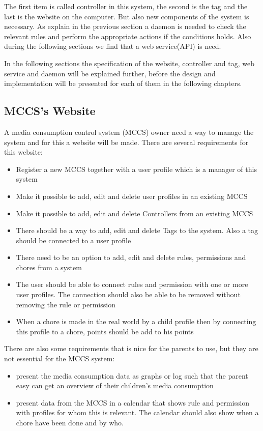 The first item is called controller in this system, the second is the tag and the last is the website on the computer. But also new components of the system is necessary. As explain in the previous section a daemon is needed to check the relevant rules and perform the appropriate actions if the conditions holds. Also during the following sections we find that a web service(API) is need. 

In the following sections the specification of the website, controller and tag, web service and daemon will be explained further, before the design and implementation will be presented for each of them in the following chapters.  

\subsection{MCCS's Website}
A media consumption control system (MCCS) owner need a way to manage the system and for this a website will be made. There are several requirements for this website:

\begin{itemize}
	\item Register a new MCCS together with a user profile which is a manager of this system
	\item Make it possible to add, edit and delete user profiles in an existing MCCS 
	\item Make it possible to add, edit and delete Controllers from an existing MCCS
	\item There should be a way to add, edit and delete Tags to the system. Also a tag should be connected to a user profile
	\item There need to be an option to add, edit and delete rules, permissions and chores from a system
	\item The user should be able to connect rules and permission with one or more user profiles. The connection should also be able to be removed without removing the rule or permission
	\item When a chore is made in the real world by a child profile then by connecting this profile to a chore, points should be add to his points
\end{itemize}

There are also some requirements that is nice for the parents to use, but they are not essential for the MCCS system:

\begin{itemize}
	\item present the media consumption data as graphs or log such that the parent easy can get an overview of their children's media consumption 
	\item present data from the MCCS in a calendar that shows rule and permission with profiles for whom this is relevant. The calendar should also show when a chore have been done and by who.
\end{itemize}

